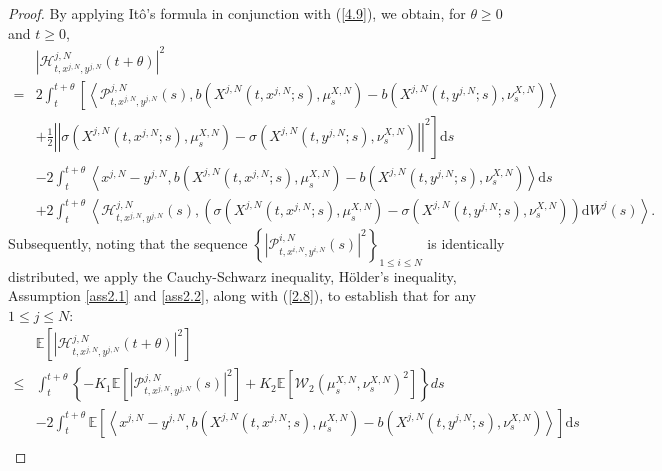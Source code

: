 \documentclass[10pt,a4paper]{amsart}
\begin{document}
\begin{proof}
By applying It{\^o}'s formula in conjunction with (\ref{4.9}), we obtain, for $\theta \geq 0$ and $t \geq 0$,
\begin{equation}\tag{5.33}\label{4.16}
\begin{aligned}
&\left|\mathcal{H}^{j,N}_{t, x^{j,N}, y^{j,N}}\left(t+\theta\right)\right|^{2} \\= &2  \int_t^{t+\theta} \left[\left\langle\mathcal{P}^{j,N}_{t, x^{j,N}, y^{j,N}}\left(s\right), b\left(X^{j,N}\left(t, x^{j,N} ;s\right), \mu _{s}^{X,N}\right)-b\left(X^{j,N}\left(t, y^{j,N} ; s\right), \nu _{s}^{X,N}\right)\right\rangle\right. \\
 &+\left.\tfrac{1}{2}\left|\left|\sigma\left(X^{j,N}\left(t, x^{j,N} ;s\right), \mu _{s}^{X,N}\right)-\sigma\left(X^{j,N}\left(t, y^{j,N} ; s\right), \nu _{s}^{X,N}\right)\right|\right|^2\right] \mathrm{d} s \\
 &-2 \int_t^{t+\theta}\left\langle x^{j,N}-y^{j,N},b\left(X^{j,N}\left(t, x^{j,N} ;s\right), \mu _{s}^{X,N}\right)-b\left(X^{j,N}\left(t, y^{j,N} ; s\right), \nu _{s}^{X,N}\right)\right\rangle \mathrm{d} s \\
&+2 \int_t^{t+\theta}\left\langle\mathcal{H}^{j,N}_{t, x^{j,N}, y^{j,N}}\left(s\right),\left(\sigma\left(X^{j,N}\left(t, x^{j,N} ;s\right), \mu _{s}^{X,N}\right)-\sigma\left(X^{j,N}\left(t, y^{j,N} ; s\right), \nu _{s}^{X,N}\right)\right) \mathrm{d} W^{j}\left(s\right)\right\rangle.
\end{aligned}
\end{equation}
Subsequently, noting that the sequence $\left\{ \left|\mathcal{P} _{t,x^{i,N},y^{i,N}}^{i,N}\left( s\right) \right|^2 \right\} _{1 \leq i\leq N}$ is identically distributed, we apply the Cauchy-Schwarz inequality, H{\"o}lder's inequality, Assumption \ref{ass2.1} and \ref{ass2.2}, along with (\ref{2.8}), to establish that for any $1\leq j\leq N$:
\begin{equation}\tag{5.34}\label{4.17}
\begin{aligned}
&\mathbb{E} \left[ \left| \mathcal{H} _{t,x^{j,N},y^{j,N}}^{j,N}\left(t+\theta \right) \right|^2 \right]\\
\le &\int_t^{t+\theta}{\left\{ -K_1\mathbb{E} \left[ \left|\mathcal{P} _{t,x^{j,N},y^{j,N}}^{j,N}\left( s \right) \right|^2 \right] +K_2\mathbb{E} \left[\mathcal{W} _2\left( \mu _{s}^{X,N},\nu _{s}^{X,N} \right) ^2\right] \right\}}ds\\
&-2\int_t^{t+\theta}{\mathbb{E}\left[ \left\langle x^{j,N}-y^{j,N},b\left(X^{j,N}\left(t,x^{j,N};s\right),\mu _{s}^{X,N}\right)-b\left(X^{j,N}\left(t,y^{j,N};s\right),\nu _{s}^{X,N}\right)\right\rangle \right]} \mathrm{d}s\\

\end{aligned}
\end{equation}
\end{proof}
\end{document}
